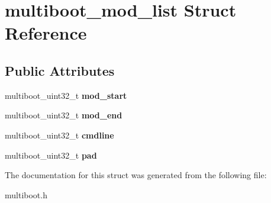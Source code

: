 \hypertarget{structmultiboot__mod__list}{}\section{multiboot\+\_\+mod\+\_\+list Struct Reference}
\label{structmultiboot__mod__list}
\subsection*{Public Attributes}
\begin{DoxyCompactItemize}
\item 
\mbox{\label{structmultiboot__mod__list_afe0e2af1e8c0297c17a7771bd1a62e0f}} 
multiboot\+\_\+uint32\+\_\+t {\bfseries mod\+\_\+start}
\item 
\mbox{\label{structmultiboot__mod__list_a75b0899f1e1f90d4ff629b7136f5b988}} 
multiboot\+\_\+uint32\+\_\+t {\bfseries mod\+\_\+end}
\item 
\mbox{\label{structmultiboot__mod__list_a31365a9d2d0cae071f5cb8bddb9b33fb}} 
multiboot\+\_\+uint32\+\_\+t {\bfseries cmdline}
\item 
\mbox{\label{structmultiboot__mod__list_a63d98e6d313098a4d35b828e204a4e0c}} 
multiboot\+\_\+uint32\+\_\+t {\bfseries pad}
\end{DoxyCompactItemize}


The documentation for this struct was generated from the following file\+:\begin{DoxyCompactItemize}
\item 
multiboot.\+h\end{DoxyCompactItemize}
